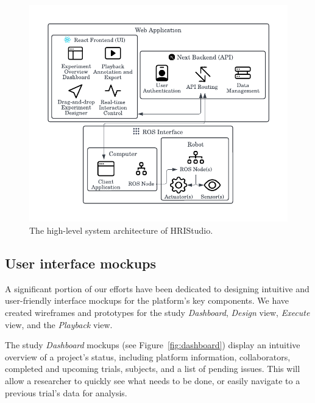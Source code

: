 \documentclass[letterpaper, 10 pt, conference]{ieeeconf}
\begin{document}
\begin{figure}
    \begin{center}
        \includegraphics[width=0.35\paperwidth]{assets/diagrams/systemarch}
        \vskip -0.5cm
        \caption{The high-level system architecture of HRIStudio.}
        \label{fig:systemarch}
     \vskip -0.8cm
     \end{center}
\end{figure}

\subsection{User interface mockups}

A significant portion of our efforts have been dedicated to designing intuitive and user-friendly interface mockups for the platform's key components. We have created wireframes and prototypes for the study \emph{Dashboard}, \emph{Design} view, \emph{Execute} view, and the \emph{Playback} view.

The study \emph{Dashboard} mockups (see Figure~\ref{fig:dashboard}) display an intuitive overview of a project's status, including platform information, collaborators, completed and upcoming trials, subjects, and a list of pending issues. This will allow a researcher to quickly see what needs to be done, or easily navigate to a previous trial's data for analysis.
\end{document}
